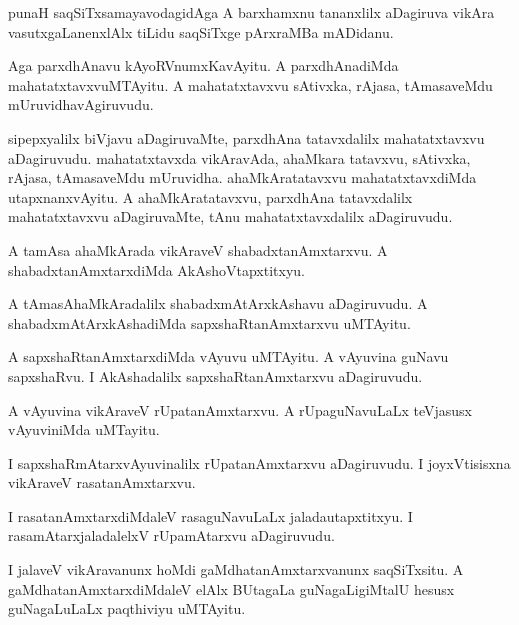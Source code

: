 \documentclass{article}
\begin{document}
\begin{mn}
punaH saqSiTxsamayavodagidAga A barxhamxnu tananxlilx aDagiruva vikAra 
vasutxgaLanenxlAlx tiLidu saqSiTxge pArxraMBa mADidanu.
\end{mn}

\begin{mn}
Aga parxdhAnavu kAyoRVnumxKavAyitu. A parxdhAnadiMda mahatatxtavxvuMTAyitu. 
A mahatatxtavxvu sAtivxka, rAjasa, tAmasaveMdu mUruvidhavAgiruvudu.
\end{mn}

\begin{mn}
sipepxyalilx biVjavu aDagiruvaMte, parxdhAna tatavxdalilx mahatatxtavxvu aDagiruvudu. 
mahatatxtavxda vikAravAda, ahaMkara tatavxvu, sAtivxka, rAjasa, tAmasaveMdu mUruvidha.
ahaMkAratatavxvu mahatatxtavxdiMda utapxnanxvAyitu. A ahaMkAratatavxvu, 
parxdhAna tatavxdalilx mahatatxtavxvu aDagiruvaMte, tAnu mahatatxtavxdalilx aDagiruvudu.
\end{mn}

\begin{mn}
A tamAsa ahaMkArada vikAraveV shabadxtanAmxtarxvu. 
A shabadxtanAmxtarxdiMda AkAshoVtapxtitxyu.
\end{mn}

\begin{mn}
A tAmasAhaMkAradalilx shabadxmAtArxkAshavu aDagiruvudu. 
A shabadxmAtArxkAshadiMda sapxshaRtanAmxtarxvu uMTAyitu.
\end{mn}

\begin{mn}
A sapxshaRtanAmxtarxdiMda vAyuvu uMTAyitu. A vAyuvina guNavu sapxshaRvu. 
I AkAshadalilx sapxshaRtanAmxtarxvu aDagiruvudu.
\end{mn}

\begin{mn}
A vAyuvina vikAraveV rUpatanAmxtarxvu. A rUpaguNavuLaLx teVjasusx vAyuviniMda uMTayitu.
\end{mn}

\begin{mn}
I sapxshaRmAtarxvAyuvinalilx rUpatanAmxtarxvu aDagiruvudu. 
I joyxVtisisxna vikAraveV rasatanAmxtarxvu. 
\end{mn}

\begin{mn}
I  rasatanAmxtarxdiMdaleV rasaguNavuLaLx jaladautapxtitxyu. 
I  rasamAtarxjaladalelxV rUpamAtarxvu aDagiruvudu.
\end{mn}

\begin{mn}
I jalaveV vikAravanunx hoMdi gaMdhatanAmxtarxvanunx saqSiTxsitu. 
A gaMdhatanAmxtarxdiMdaleV elAlx BUtagaLa guNagaLigiMtalU 
hesusx guNagaLuLaLx paqthiviyu uMTAyitu. 
\end{mn}
\end{document}
